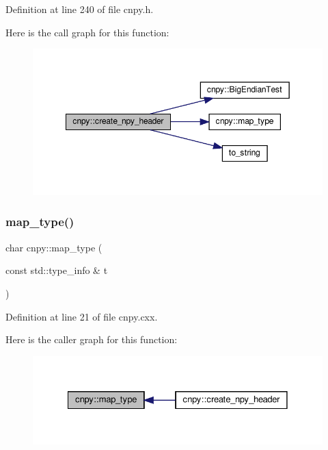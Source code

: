 Definition at line 240 of file cnpy.\+h.

Here is the call graph for this function\+:
\nopagebreak
\begin{figure}[H]
\begin{center}
\leavevmode
\includegraphics[width=349pt]{namespacecnpy_a9e4cd705ce96b2350ba17bfdf6f09a24_cgraph}
\end{center}
\end{figure}
\mbox{\label{namespacecnpy_a569c852a9455b0b0c2a6ffc358155127}} 
\subsubsection{\texorpdfstring{map\+\_\+type()}{map\_type()}}
{\footnotesize\ttfamily char cnpy\+::map\+\_\+type (\begin{DoxyParamCaption}\item[{const std\+::type\+\_\+info \&}]{t }\end{DoxyParamCaption})}



Definition at line 21 of file cnpy.\+cxx.

Here is the caller graph for this function\+:
\nopagebreak
\begin{figure}[H]
\begin{center}
\leavevmode
\includegraphics[width=328pt]{namespacecnpy_a569c852a9455b0b0c2a6ffc358155127_icgraph}
\end{center}
\end{figure}
\mbox{\label{namespacecnpy_abffb25587a54473fbe1d3c86fa4df4fb}} 
